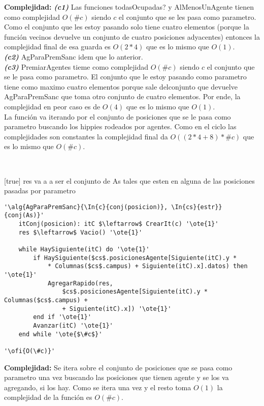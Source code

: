\textbf{Complejidad:} \textit{\textbf{(c1)}} Las funciones todasOcupadas? y AlMenosUnAgente tienen como complejidad $O(\#c)$ siendo $c$ el conjunto que se les pasa como parametro. Como el conjunto que les estoy pasando solo tiene cuatro elementos (porque la función vecinos devuelve un conjunto de cuatro posiciones adyacentes) entonces la complejidad final de esa guarda es $O(2*4)$ que es lo mismo que $O(1)$. \\
\textit{\textbf{(c2)}} AgParaPremSanc idem que lo anterior. \\
\textit{\textbf{(c3)}} PremiarAgentes tieme como complejidad $O(\#c)$ siendo $c$ el conjunto que se le pasa como parametro. El conjunto que le estoy pasando como parametro tiene como maximo cuatro elementos porque sale delconjunto que devuelve AgParaPremSanc que toma otro conjunto de cuatro elementos. Por ende, la complejidad en peor caso es de $O(4)$ que es lo mismo que $O(1)$. \\
La función va iterando por el conjunto de posiciones que se le pasa como parametro buscando los hippies rodeados por agentes. Como en el ciclo las complejidades son constantes la complejidad final da $O((2*4+8)*\#c)$ que es lo mismo que $O(\#c)$.

~


[true]
{res va a a ser el conjunto de As tales que esten en alguna de las posiciones pasadas por parametro}

\begin{lstlisting}[mathescape]
'\alg{AgParaPremSanc}{\In{c}{conj(posicion)}, \In{cs}{estr}}{conj(As)}'
	itConj(posicion): itC $\leftarrow$ CrearIt(c) '\ote{1}'
	res $\leftarrow$ Vacio() '\ote{1}'

	while HaySiguiente(itC) do '\ote{1}'
		if HaySiguiente($cs$.posicionesAgente[Siguiente(itC).y *
			* Columnas($cs$.campus) + Siguiente(itC).x].datos) then '\ote{1}'
			AgregarRapido(res,
				$cs$.posicionesAgente[Siguiente(itC).y * Columnas($cs$.campus) +
				+ Siguiente(itC).x]) '\ote{1}'
		end if '\ote{1}'
		Avanzar(itC) '\ote{1}'
	end while '\ote{$\#c$}'

'\ofi{O(\#c)}'
\end{lstlisting}

\textbf{Complejidad:} Se itera sobre el conjunto de posiciones que se pasa como parametro una vez buscando las posiciones que tienen agente y se los va agregando, si los hay. Como se itera una vez y el resto toma $O(1)$ la complejidad de la función es $O(\#c)$.

